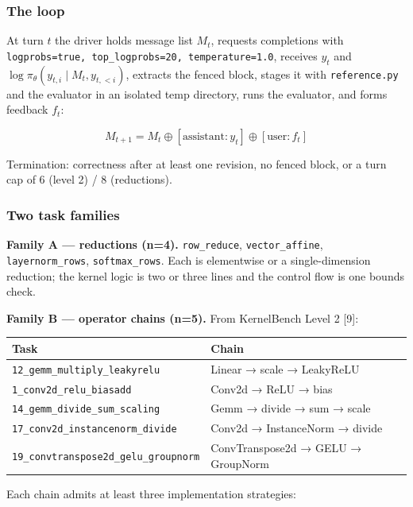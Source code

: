 \documentclass[
  11pt,
]{article}
\begin{document}
\hypertarget{the-loop}{%
\subsubsection{The loop}\label{the-loop}}

At turn \(t\) the driver holds message list \(M_t\), requests
completions with
\texttt{logprobs=true,\ top\_logprobs=20,\ temperature=1.0}, receives
\(y_t\) and \(\log\pi_\theta(y_{t,i} \mid M_t, y_{t,<i})\), extracts the
fenced block, stages it with \texttt{reference.py} and the evaluator in
an isolated temp directory, runs the evaluator, and forms feedback
\(f_t\):

\[M_{t+1} = M_t \oplus [\text{assistant}: y_t] \oplus [\text{user}: f_t]\]

Termination: correctness after at least one revision, no fenced block,
or a turn cap of 6 (level 2) / 8 (reductions).

\hypertarget{two-task-families}{%
\subsubsection{Two task families}\label{two-task-families}}

\textbf{Family A --- reductions (n=4).} \texttt{row\_reduce},
\texttt{vector\_affine}, \texttt{layernorm\_rows},
\texttt{softmax\_rows}. Each is elementwise or a single-dimension
reduction; the kernel logic is two or three lines and the control flow
is one bounds check.

\textbf{Family B --- operator chains (n=5).} From KernelBench Level 2
{[}9{]}:

\begin{longtable}[]{@{}ll@{}}
\toprule
Task & Chain \\
\midrule
\endhead
\texttt{12\_gemm\_multiply\_leakyrelu} & Linear → scale → LeakyReLU \\
\texttt{1\_conv2d\_relu\_biasadd} & Conv2d → ReLU → bias \\
\texttt{14\_gemm\_divide\_sum\_scaling} & Gemm → divide → sum → scale \\
\texttt{17\_conv2d\_instancenorm\_divide} & Conv2d → InstanceNorm →
divide \\
\texttt{19\_convtranspose2d\_gelu\_groupnorm} & ConvTranspose2d → GELU →
GroupNorm \\
\bottomrule
\end{longtable}

Each chain admits at least three implementation strategies:
\end{document}
